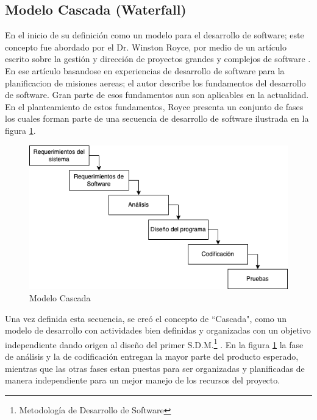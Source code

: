 \subsection{Modelo Cascada (Waterfall)}
En el inicio de su definición como un modelo para el desarrollo de software; este concepto fue abordado por el Dr. Winston Royce, por medio de un artículo escrito sobre la gestión y dirección de proyectos grandes y complejos de software \cite{Winston}. En ese artículo basandose en experiencias de desarrollo de software para la planificacion de misiones aereas; el autor describe los fundamentos del desarrollo de software. Gran parte de esos fundamentos aun son aplicables en la actualidad. En el planteamiento de estos fundamentos, Royce presenta un conjunto de fases los cuales forman parte de una secuencia de desarrollo de software ilustrada en la figura \ref{fig:cascada}.

\begin{figure}[H]
    \begin{center}
        \includegraphics[width=12cm]{img/capitulo_2/cascada2.png}
    \end{center}
    \caption{Modelo Cascada}
    \label{fig:cascada}
\end{figure}

Una vez definida esta secuencia, se creó el concepto de ``Cascada", como un modelo de desarrollo con actividades bien definidas y organizadas con un objetivo independiente dando origen al diseño del primer S.D.M.\footnote{Metodología de Desarrollo de Software} \cite{Bell&Thayer}. En la figura \ref{fig:cascada} la fase de análisis y la de codificación entregan la mayor parte del producto esperado, mientras que las otras fases estan puestas para ser organizadas y planificadas de manera independiente para un mejor manejo de los recursos del proyecto.\\

